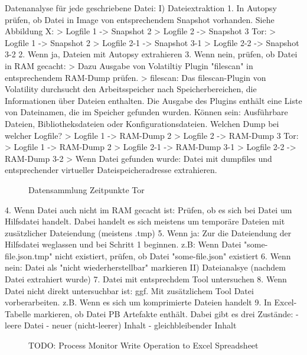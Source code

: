 Datenanalyse für jede geschriebene Datei:
I) Dateiextraktion
	1.	In Autopsy prüfen, ob Datei in Image von entsprechendem Snapshot vorhanden. Siehe Abbildung X: 
			> Logfile 1 -> Snapshot 2
			> Logfile 2 -> Snapshot 3
		Tor:
			> Logfile 1 -> Snapshot 2
			> Logfile 2-1 -> Snapshot 3-1
			> Logfile 2-2 -> Snapshot 3-2
	2.	Wenn ja, Dateien mit Autopsy extrahieren 
	3.	Wenn nein, prüfen, ob Datei in RAM gecacht:
		> Dazu Ausgabe von Volatiltiy Plugin "filescan" in entsprechendem RAM-Dump prüfen.
			> filescan: Das filescan-Plugin von Volatility durchsucht den Arbeitsspeicher nach Speicherbereichen, die Informationen über Dateien enthalten. Die Ausgabe des Plugins enthält eine Liste von Dateinamen, die im Speicher gefunden wurden. Können sein: Ausführbare Dateien, Bibliotheksdateien oder Konfigurationsdateien.
		Welchen Dump bei welcher Logfile?
			> Logfile 1 -> RAM-Dump 2
			> Logfile 2 -> RAM-Dump 3
		Tor:
			> Logfile 1 -> RAM-Dump 2
			> Logfile 2-1 -> RAM-Dump 3-1
			> Logfile 2-2 -> RAM-Dump 3-2
		> Wenn Datei gefunden wurde: Datei mit dumpfiles und entsprechender virtueller Dateispeicheradresse extrahieren.
		\begin{figure}[h!]
			\centering
			\small
			\centerline{\resizebox{\linewidth}{!}{}}
			\caption{Datensammlung Zeitpunkte Tor}
			\label{fig:jes}
		\end{figure}
	4. Wenn Datei auch nicht im RAM gecacht ist: Prüfen, ob es sich bei Datei um Hilfsdatei handelt. Dabei handelt es sich meistens um temporäre Dateien mit zusätzlicher Dateiendung (meistens .tmp)
	5. Wenn ja: Zur die Dateiendung der Hilfsdatei weglassen und bei Schritt 1 beginnen. z.B: Wenn Datei "some-file.json.tmp" nicht existiert, prüfen, ob Datei "some-file.json" existiert
	6. Wenn nein: Datei als "nicht wiederherstellbar" markieren
II) Dateianalsye (nachdem Datei extrahiert wurde)
	7. Datei mit entsprechdem Tool untersuchen 
	8. Wenn Datei nicht direkt untersuchbar ist: ggf. Mit zusätzlichem Tool Datei vorberarbeiten. z.B. Wenn es sich um komprimierte Dateien handelt
	9. In Excel-Tabelle markieren, ob Datei PB Artefakte enthält. Dabei gibt es drei Zustände: 
		- leere Datei
		- neuer (nicht-leerer) Inhalt
		- gleichbleibender Inhalt
	\begin{figure}[h!]
		\centering
		\small
		\centerline{\resizebox{\linewidth}{!}{}}
		\caption{TODO: Process Monitor Write Operation to Excel Spreadsheet}
		\label{fig:jes}
	\end{figure}

